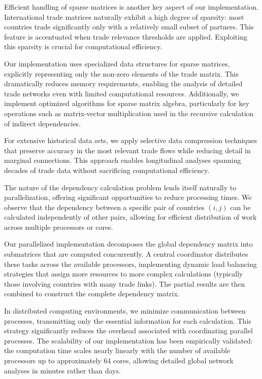 \documentclass[final,1p,times,authoryear]{elsarticle}
\begin{document}
Efficient handling of sparse matrices is another key aspect of our implementation. International trade matrices naturally exhibit a high degree of sparsity: most countries trade significantly only with a relatively small subset of partners. This feature is accentuated when trade relevance thresholds are applied. Exploiting this sparsity is crucial for computational efficiency.

Our implementation uses specialized data structures for sparse matrices, explicitly representing only the non-zero elements of the trade matrix. This dramatically reduces memory requirements, enabling the analysis of detailed trade networks even with limited computational resources. Additionally, we implement optimized algorithms for sparse matrix algebra, particularly for key operations such as matrix-vector multiplication used in the recursive calculation of indirect dependencies.

For extensive historical data sets, we apply selective data compression techniques that preserve accuracy in the most relevant trade flows while reducing detail in marginal connections. This approach enables longitudinal analyses spanning decades of trade data without sacrificing computational efficiency.

The nature of the dependency calculation problem lends itself naturally to parallelization, offering significant opportunities to reduce processing times. We observe that the dependency between a specific pair of countries $(i,j)$ can be calculated independently of other pairs, allowing for efficient distribution of work across multiple processors or cores.

Our parallelized implementation decomposes the global dependency matrix into submatrices that are computed concurrently. A central coordinator distributes these tasks across the available processors, implementing dynamic load balancing strategies that assign more resources to more complex calculations (typically those involving countries with many trade links). The partial results are then combined to construct the complete dependency matrix.

In distributed computing environments, we minimize communication between processes, transmitting only the essential information for each calculation. This strategy significantly reduces the overhead associated with coordinating parallel processes. The scalability of our implementation has been empirically validated: the computation time scales nearly linearly with the number of available processors up to approximately 64 cores, allowing detailed global network analyses in minutes rather than days.
\end{document}
